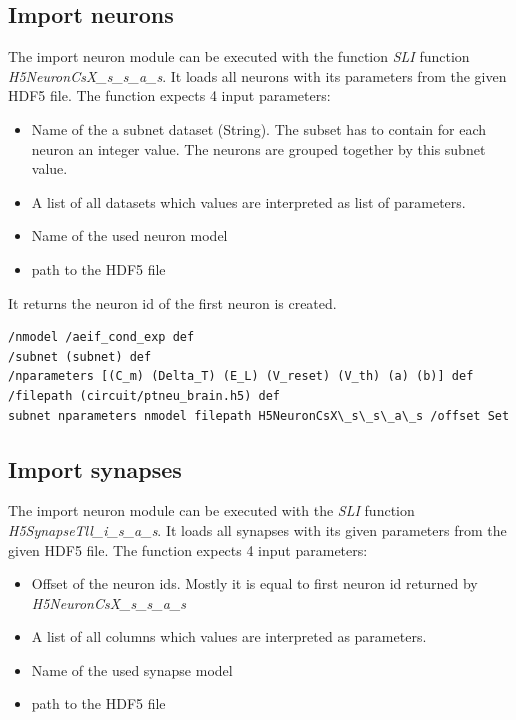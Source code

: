 \subsection{Import neurons}
The import neuron module can be executed with the function \emph{SLI} function  \emph{H5NeuronCsX\_s\_s\_a\_s}. It loads all neurons with its parameters
from the given HDF5 file. The function expects 4 input parameters:
\begin{itemize}
      \item Name of the a subnet dataset (String).
The subset has to contain for each neuron an integer value.
The neurons are grouped together by this subnet value.
      \item A list of all datasets which values are interpreted as list of parameters.
      \item Name of the used neuron model
      \item path to the HDF5 file 
\end{itemize}
It returns the neuron id of the first neuron is created.
\begin{lstlisting}[label=sliNeurons,caption=Calling the neuron import module via H5NeuronCsX\_s\_s\_a\_s SLI command ]
/nmodel /aeif_cond_exp def
/subnet (subnet) def
/nparameters [(C_m) (Delta_T) (E_L) (V_reset) (V_th) (a) (b)] def
/filepath (circuit/ptneu_brain.h5) def
subnet nparameters nmodel filepath H5NeuronCsX\_s\_s\_a\_s /offset Set
\end{lstlisting}

\subsection{Import synapses}
The import neuron module can be executed with the \emph{SLI} function  \emph{H5SynapseTll\_i\_s\_a\_s}. It loads all synapses with its given parameters
from the given HDF5 file. The function expects 4 input parameters:
 
\begin{itemize}
      \item Offset of the neuron ids. Mostly it is equal to first neuron id returned by \emph{H5NeuronCsX\_s\_s\_a\_s}

      \item A list of all columns which values are interpreted as parameters.
      
      \item Name of the used synapse model
      
      \item path to the HDF5 file 
\end{itemize}

